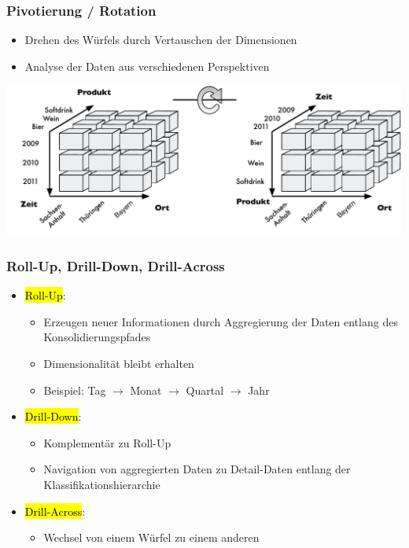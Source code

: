         
        \begin{frame}
        
        \frametitle{Pivotierung / Rotation}
        \begin{itemize}
        \item Drehen des Würfels durch Vertauschen der Dimensionen
        \item Analyse der Daten aus verschiedenen Perspektiven
        \end{itemize}
        
        \begin{center}
        \includegraphics[scale=.6]{fig6/OLAP-Pivot.pdf}
        \end{center}
        \end{frame}
        
        
        \begin{frame}
        
        \frametitle{Roll-Up, Drill-Down, Drill-Across}
        \begin{itemize}
        \item \hl{Roll-Up}:
          \begin{itemize}
          \item Erzeugen neuer Informationen durch Aggregierung der Daten
            entlang des Konsolidierungspfades
          \item Dimensionalität bleibt erhalten
          \item Beispiel: Tag $\to$ Monat $\to$ Quartal $\to$ Jahr
          \end{itemize}
        \item \hl{Drill-Down}:
          \begin{itemize}
          \item Komplementär zu Roll-Up
          \item Navigation von aggregierten Daten zu Detail-Daten entlang der
            Klassifikationshierarchie
          \end{itemize}
        \item \hl{Drill-Across}:
          \begin{itemize}
          \item Wechsel von einem Würfel zu einem anderen
          \end{itemize}
        \end{itemize}
        
        
        \end{frame}
        

